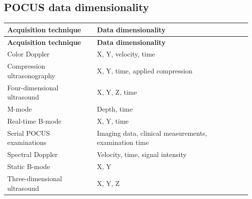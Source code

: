 \subsection{POCUS data dimensionality}
\begin{longtable}{@{}p{}p{}@{}}
\toprule
\textbf{Acquisition technique} & \textbf{Data dimensionality} \\
\midrule
\endfirsthead
\toprule
\textbf{Acquisition technique} & \textbf{Data dimensionality} \\
\midrule
\endhead
Color Doppler & X, Y, velocity, time \\
Compression ultrasonography & X, Y, time, applied compression \\
Four-dimensional ultrasound & X, Y, Z, time \\
M-mode & Depth, time \\
Real-time B-mode & X, Y, time \\
Serial POCUS examinations & Imaging data, clinical measurements, examination time \\
Spectral Doppler & Velocity, time, signal intensity \\
Static B-mode & X, Y \\
Three-dimensional ultrasound & X, Y, Z \\
\bottomrule
\end{longtable}

